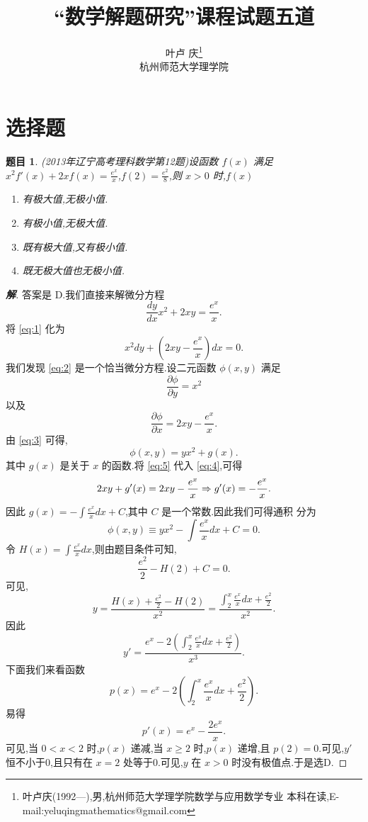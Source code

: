 \documentclass[a4paper]{article}
\newtheorem*{hypo}{题目}
\newcommand{\pa}{\partial} \newcommand{\Om}{\Omega}
\begin{document}
\title{\huge{\bf{“数学解题研究”课程试题五道}}} \author{\small{叶卢
    庆\footnote{叶卢庆(1992---),男,杭州师范大学理学院数学与应用数学专业
      本科在读,E-mail:yeluqingmathematics@gmail.com}}\\{\small{杭州师范大学理学院}}}\date{}
\maketitle
\section{选择题}
\label{sec:1}
\begin{hypo}
(2013年辽宁高考理科数学第12题)设函数 $f(x)$ 满足
$x^2f'(x)+2xf(x)=\frac{e^x}{x}$,$f(2)=\frac{e^2}{8}$,则 $x>0$ 时,$f(x)$
\begin{enumerate}
\item[A] 有极大值,无极小值.
\item[B] 有极小值,无极大值.
\item[C] 既有极大值,又有极小值.
\item[D] 既无极大值也无极小值.
\end{enumerate}
\end{hypo}
\begin{proof}[\textbf{解}]
答案是 D.我们直接来解微分方程
\begin{equation}
  \label{eq:1}
 \frac{dy}{dx}x^2+2xy=\frac{e^x}{x}.
\end{equation}
将 \eqref{eq:1} 化为
\begin{equation}
  \label{eq:2}
  x^2dy+(2xy-\frac{e^x}{x})dx=0.
\end{equation}
我们发现 \eqref{eq:2} 是一个恰当微分方程.设二元函数 $\phi(x,y)$ 满足
\begin{equation}
  \label{eq:3}
    \frac{\pa\phi}{\pa y}=x^2
\end{equation}
以及
\begin{equation}
  \label{eq:4}
  \frac{\pa\phi}{\pa x}=2xy-\frac{e^x}{x}.
\end{equation}
由 \eqref{eq:3} 可得,
\begin{equation}
  \label{eq:5}
  \phi(x,y)=yx^2+g(x).
\end{equation}
其中 $g(x)$ 是关于 $x$ 的函数.将 \eqref{eq:5} 代入 \eqref{eq:4},可得
\begin{equation}
  \label{eq:6}
  2xy+g'(x)=2xy-\frac{e^x}{x}\Rightarrow g'(x)=-\frac{e^x}{x}.
\end{equation}
因此 $g(x)=-\int \frac{e^x}{x}dx+C$,其中 $C$ 是一个常数.因此我们可得通积
分为
$$
\phi(x,y)\equiv yx^2-\int \frac{e^x}{x}dx+C=0.
$$
令 $H(x)=\int \frac{e^x}{x}dx$,则由题目条件可知,
$$
\frac{e^2}{2}-H(2)+C=0.
$$
可见,
$$
y=\frac{H(x)+\frac{e^2}{2}-H(2)}{x^2}=\frac{\int_2^x \frac{e^x}{x}dx+\frac{e^2}{2}}{x^2}.
$$
因此
$$
y'=\frac{e^{x}-2(\int_2^{x} \frac{e^{x}}{x}dx+\frac{e^2}{2})}{x^3}.
$$
下面我们来看函数
$$
p(x)=e^x-2(\int_2^x \frac{e^x}{x}dx+\frac{e^2}{2}).
$$
易得
$$
p'(x)=e^x-\frac{2e^x}{x}.
$$
可见,当 $0<x<2$ 时,$p(x)$ 递减,当 $x\geq 2$ 时,$p(x)$ 递增,且
$p(2)=0$.可见,$y'$ 恒不小于0,且只有在 $x=2$ 处等于0.可见,$y$ 在 $x>0$
时没有极值点.于是选D.
\end{proof}
\end{document}
